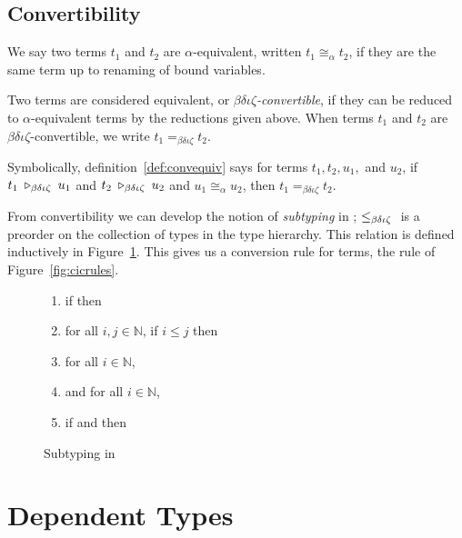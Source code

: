 \subsection{Convertibility}

We say two terms $t_1$ and $t_2$ are $\alpha$-equivalent, written $t_1 \cong_\alpha t_2$, if they are the same term up to renaming of bound variables.

\begin{defnc}
\label{def:convequiv}
Two terms are considered equivalent, or \emph{$\beta\delta\iota\zeta$-convertible}, if they can be reduced to $\alpha$-equivalent terms by the reductions given above. When terms $t_1$ and $t_2$ are $\beta\delta\iota\zeta$-convertible, we write $t_1 =_{\beta\delta\iota\zeta} t_2$.
\end{defnc}

Symbolically, definition~\ref{def:convequiv} says for terms $t_1, t_2, u_1,$ and $u_2$, if $t_1 \; \triangleright_{\beta\delta\iota\zeta} \;{} u_1$ and $t_2 \; \triangleright_{\beta\delta\iota\zeta} \;{} u_2$ and $u_1 \cong_\alpha u_2$, then $t_1 =_{\beta\delta\iota\zeta} t_2$.

From convertibility we can develop the notion of \emph{subtyping} in \coc; $\leq_{\beta\delta\iota\zeta}{}$ is a preorder on the collection of types in the type hierarchy. This relation is defined inductively in Figure~\ref{fig:conv}. This gives us a conversion rule for terms, the rule  of Figure~\ref{fig:cicrules}.

\begin{figure}
\begin{enumerate}
 \item if  then 
 \item for all $i, j \in \mathbb{N}$, if $i \leq j$ then 
 \item for all $i \in \mathbb{N}$, 
 \item {} and for all $i \in \mathbb{N}$, 
 \item if  and  then 
\end{enumerate}
\caption{Subtyping in \coc{} \label{fig:conv}}
\end{figure}



\section{Dependent Types}
\label{sec:deptype}

